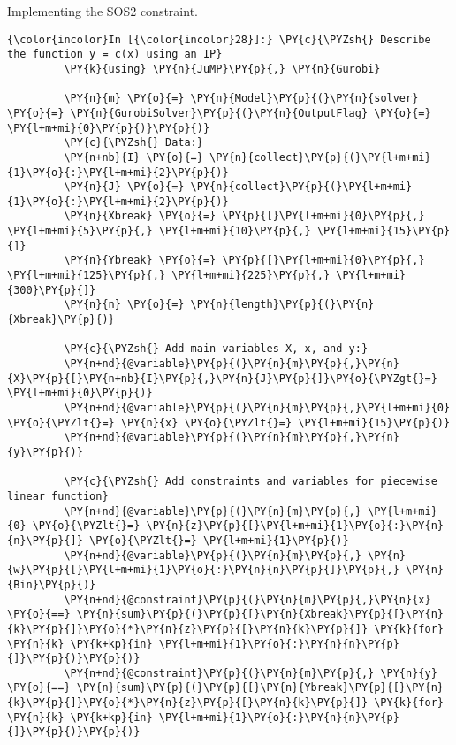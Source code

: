 
Implementing the SOS2 constraint.
\begin{codeCell}
\label{code:pwl-application}


    \begin{Verbatim}[commandchars=\\\{\}]
{\color{incolor}In [{\color{incolor}28}]:} \PY{c}{\PYZsh{} Describe the function y = c(x) using an IP}
         \PY{k}{using} \PY{n}{JuMP}\PY{p}{,} \PY{n}{Gurobi}
         
         \PY{n}{m} \PY{o}{=} \PY{n}{Model}\PY{p}{(}\PY{n}{solver} \PY{o}{=} \PY{n}{GurobiSolver}\PY{p}{(}\PY{n}{OutputFlag} \PY{o}{=} \PY{l+m+mi}{0}\PY{p}{)}\PY{p}{)}
         \PY{c}{\PYZsh{} Data:}
         \PY{n+nb}{I} \PY{o}{=} \PY{n}{collect}\PY{p}{(}\PY{l+m+mi}{1}\PY{o}{:}\PY{l+m+mi}{2}\PY{p}{)}
         \PY{n}{J} \PY{o}{=} \PY{n}{collect}\PY{p}{(}\PY{l+m+mi}{1}\PY{o}{:}\PY{l+m+mi}{2}\PY{p}{)}
         \PY{n}{Xbreak} \PY{o}{=} \PY{p}{[}\PY{l+m+mi}{0}\PY{p}{,} \PY{l+m+mi}{5}\PY{p}{,} \PY{l+m+mi}{10}\PY{p}{,} \PY{l+m+mi}{15}\PY{p}{]}
         \PY{n}{Ybreak} \PY{o}{=} \PY{p}{[}\PY{l+m+mi}{0}\PY{p}{,} \PY{l+m+mi}{125}\PY{p}{,} \PY{l+m+mi}{225}\PY{p}{,} \PY{l+m+mi}{300}\PY{p}{]}
         \PY{n}{n} \PY{o}{=} \PY{n}{length}\PY{p}{(}\PY{n}{Xbreak}\PY{p}{)}
    
         \PY{c}{\PYZsh{} Add main variables X, x, and y:}
         \PY{n+nd}{@variable}\PY{p}{(}\PY{n}{m}\PY{p}{,}\PY{n}{X}\PY{p}{[}\PY{n+nb}{I}\PY{p}{,}\PY{n}{J}\PY{p}{]}\PY{o}{\PYZgt{}=} \PY{l+m+mi}{0}\PY{p}{)}
         \PY{n+nd}{@variable}\PY{p}{(}\PY{n}{m}\PY{p}{,}\PY{l+m+mi}{0} \PY{o}{\PYZlt{}=} \PY{n}{x} \PY{o}{\PYZlt{}=} \PY{l+m+mi}{15}\PY{p}{)}
         \PY{n+nd}{@variable}\PY{p}{(}\PY{n}{m}\PY{p}{,}\PY{n}{y}\PY{p}{)}
         
         \PY{c}{\PYZsh{} Add constraints and variables for piecewise linear function}
         \PY{n+nd}{@variable}\PY{p}{(}\PY{n}{m}\PY{p}{,} \PY{l+m+mi}{0} \PY{o}{\PYZlt{}=} \PY{n}{z}\PY{p}{[}\PY{l+m+mi}{1}\PY{o}{:}\PY{n}{n}\PY{p}{]} \PY{o}{\PYZlt{}=} \PY{l+m+mi}{1}\PY{p}{)}
         \PY{n+nd}{@variable}\PY{p}{(}\PY{n}{m}\PY{p}{,} \PY{n}{w}\PY{p}{[}\PY{l+m+mi}{1}\PY{o}{:}\PY{n}{n}\PY{p}{]}\PY{p}{,} \PY{n}{Bin}\PY{p}{)}
         \PY{n+nd}{@constraint}\PY{p}{(}\PY{n}{m}\PY{p}{,}\PY{n}{x} \PY{o}{==} \PY{n}{sum}\PY{p}{(}\PY{p}{[}\PY{n}{Xbreak}\PY{p}{[}\PY{n}{k}\PY{p}{]}\PY{o}{*}\PY{n}{z}\PY{p}{[}\PY{n}{k}\PY{p}{]} \PY{k}{for} \PY{n}{k} \PY{k+kp}{in} \PY{l+m+mi}{1}\PY{o}{:}\PY{n}{n}\PY{p}{]}\PY{p}{)}\PY{p}{)}
         \PY{n+nd}{@constraint}\PY{p}{(}\PY{n}{m}\PY{p}{,} \PY{n}{y} \PY{o}{==} \PY{n}{sum}\PY{p}{(}\PY{p}{[}\PY{n}{Ybreak}\PY{p}{[}\PY{n}{k}\PY{p}{]}\PY{o}{*}\PY{n}{z}\PY{p}{[}\PY{n}{k}\PY{p}{]} \PY{k}{for} \PY{n}{k} \PY{k+kp}{in} \PY{l+m+mi}{1}\PY{o}{:}\PY{n}{n}\PY{p}{]}\PY{p}{)}\PY{p}{)}
         

\end{Verbatim}
\end{codeCell}
